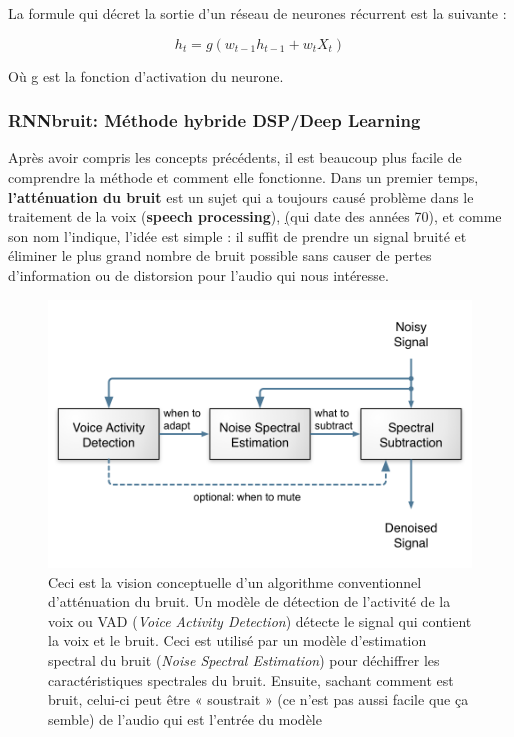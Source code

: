 \documentclass[conference,onecolumn]{IEEEtran}
\begin{document}
La formule qui décret la sortie d’un réseau de neurones récurrent est la suivante :

\begin{equation}
    h_t = g(w_{t-1}h_{t-1} + w_tX_t) 
\end{equation}


Où g est la fonction d’activation du neurone.  

\subsubsection{\textbf{RNNbruit: Méthode hybride DSP/Deep Learning}}
\medskip
\hfill
\medskip
Après avoir compris les concepts précédents, il est beaucoup plus facile de comprendre la méthode et comment elle fonctionne. Dans un premier temps, \textbf{l’atténuation du bruit} est un sujet qui a toujours causé problème dans le traitement de la voix (\textbf{speech processing}), \href{https://ieeexplore.ieee.org/document/1163209} (qui date des années 70), et comme son nom l’indique, l’idée est simple : il suffit de prendre un signal bruité et éliminer le plus grand nombre de bruit possible sans causer de pertes d’information ou de distorsion pour l’audio qui nous intéresse. 
 \begin{figure}[H]
 \centering
    \includegraphics[scale=0.7]{noise_suppression.png}
    \caption{Ceci est la vision conceptuelle d’un algorithme conventionnel d’atténuation du bruit. Un modèle de détection de l’activité de la voix ou VAD (\textit{Voice Activity Detection}) détecte le signal qui contient la voix et le bruit. Ceci est utilisé par un modèle d’estimation spectral du bruit (\textit{Noise Spectral Estimation}) pour déchiffrer les caractéristiques spectrales du bruit. Ensuite, sachant comment est bruit, celui-ci peut être « soustrait » (ce n’est pas aussi facile que ça semble) de l’audio qui est l’entrée du modèle }
    \label{Figure 14}
\end{figure}
\end{document}
